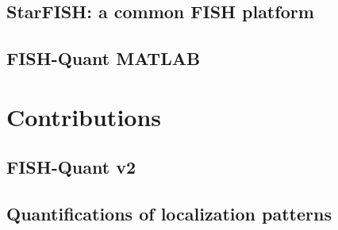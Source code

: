 \subsection{StarFISH: a common \ac{FISH} platform}

\subsection{FISH-Quant MATLAB}

\section{Contributions}
\label{sec:contributions}

\subsection{FISH-Quant v2}

\subsection{Quantifications of localization patterns}
